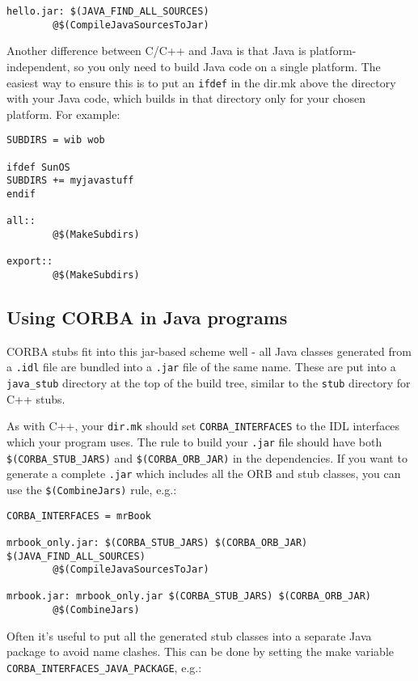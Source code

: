 \documentclass[11pt,twoside,onecolumn]{article}
\begin{document}
{\footnotesize \begin{verbatim}
hello.jar: $(JAVA_FIND_ALL_SOURCES)
        @$(CompileJavaSourcesToJar)
\end{verbatim}}

Another difference between C/C++ and Java is that Java is platform-independent,
so you only need to build Java code on a single platform.  The easiest way to
ensure this is to put an \verb|ifdef| in the dir.mk above the directory with
your Java code, which builds in that directory only for your chosen platform.  For example:

{\footnotesize \begin{verbatim}
SUBDIRS = wib wob

ifdef SunOS
SUBDIRS += myjavastuff
endif

all::
        @$(MakeSubdirs)

export::
        @$(MakeSubdirs)
\end{verbatim}}

\subsection{Using CORBA in Java programs}

CORBA stubs fit into this jar-based scheme well - all Java classes generated
from a \verb|.idl| file are bundled into a \verb|.jar| file of the same name.
These are put into a \verb|java_stub| directory at the top of the build tree,
similar to the \verb|stub| directory for C++ stubs.

As with C++, your {\tt dir.mk} should set \verb|CORBA_INTERFACES| to the IDL
interfaces which your program uses.  The rule to build your \verb|.jar| file
should have both \verb|$(CORBA_STUB_JARS)| and \verb|$(CORBA_ORB_JAR)| in the
dependencies.  If you want to generate a complete \verb|.jar| which includes
all the ORB and stub classes, you can use the \verb|$(CombineJars)| rule, e.g.:

{\footnotesize \begin{verbatim}
CORBA_INTERFACES = mrBook

mrbook_only.jar: $(CORBA_STUB_JARS) $(CORBA_ORB_JAR) $(JAVA_FIND_ALL_SOURCES)
        @$(CompileJavaSourcesToJar)

mrbook.jar: mrbook_only.jar $(CORBA_STUB_JARS) $(CORBA_ORB_JAR)
        @$(CombineJars)
\end{verbatim}}

Often it's useful to put all the generated stub classes into a separate Java
package to avoid name clashes.  This can be done by setting the make variable
\verb|CORBA_INTERFACES_JAVA_PACKAGE|, e.g.:
\end{document}
